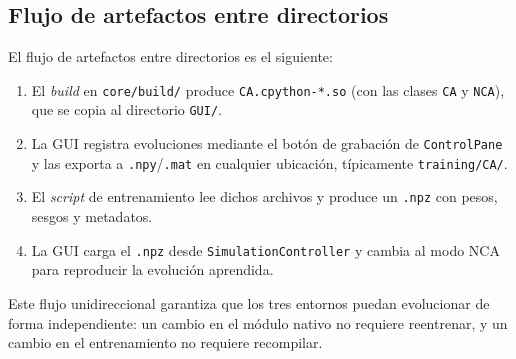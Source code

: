 \subsection{Flujo de artefactos entre directorios}

El flujo de artefactos entre directorios es el siguiente:

\begin{enumerate}
    \item El \textit{build} en \texttt{core/build/} produce \texttt{CA.cpython-*.so} (con las clases \texttt{CA} y \texttt{NCA}), que se copia al directorio \texttt{GUI/}.
    \item La GUI registra evoluciones mediante el botón de grabación de \texttt{ControlPane} y las exporta a \texttt{.npy}/\texttt{.mat} en cualquier ubicación, típicamente \texttt{training/CA/}.
    \item El \textit{script} de entrenamiento lee dichos archivos y produce un \texttt{.npz} con pesos, sesgos y metadatos.
    \item La GUI carga el \texttt{.npz} desde \texttt{SimulationController} y cambia al modo NCA para reproducir la evolución aprendida.
\end{enumerate}

Este flujo unidireccional garantiza que los tres entornos puedan evolucionar de forma independiente: un cambio en el módulo nativo no requiere reentrenar, y un cambio en el entrenamiento no requiere recompilar.
